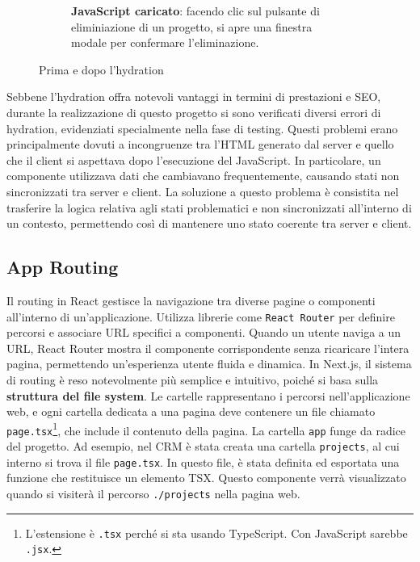 \documentclass[target=bach,aauheader=,style=]{thud}
\begin{document}
\begin{figure}[H]
\begin{subfigure}[b]{0.46\textwidth}
        \caption{\textbf{JavaScript caricato}: facendo clic sul pulsante di eliminiazione di un progetto, si apre una finestra modale per confermare l'eliminazione.}
        \label{fig:img2}
    \end{subfigure}
    \caption{Prima e dopo l'hydration}
    \label{fig:two_images}
\end{figure}

\label{sec:hydration_error}
\noindent Sebbene l'hydration offra notevoli vantaggi in termini di prestazioni e SEO, durante la realizzazione di questo progetto si sono verificati diversi errori di hydration, evidenziati specialmente nella fase di testing. Questi problemi erano principalmente dovuti a incongruenze tra l'HTML generato dal server e quello che il client si aspettava dopo l'esecuzione del JavaScript. In particolare, un componente utilizzava dati che cambiavano frequentemente, causando stati non sincronizzati tra server e client. La soluzione a questo problema è consistita nel trasferire la logica relativa agli stati problematici e non sincronizzati all'interno di un contesto, permettendo così di mantenere uno stato coerente tra server e client.

\subsection{App Routing}
Il routing in React gestisce la navigazione tra diverse pagine o componenti all'interno di un'applicazione. Utilizza librerie come \texttt{React Router} per definire percorsi e associare URL specifici a componenti. Quando un utente naviga a un URL, React Router mostra il componente corrispondente senza ricaricare l'intera pagina, permettendo un'esperienza utente fluida e dinamica. In Next.js, il sistema di routing è reso notevolmente più semplice e intuitivo, poiché si basa sulla \textbf{struttura del file system}. Le cartelle rappresentano i percorsi nell'applicazione web, e ogni cartella dedicata a una pagina deve contenere un file chiamato \texttt{page.tsx}\footnote{L'estensione è \texttt{.tsx} perché si sta usando TypeScript. Con JavaScript sarebbe \texttt{.jsx}.}, che include il contenuto della pagina. La cartella \texttt{app} funge da radice del progetto. Ad esempio, nel CRM è stata creata una cartella \texttt{projects}, al cui interno si trova il file \texttt{page.tsx}. In questo file, è stata definita ed esportata una funzione che restituisce un elemento TSX. Questo componente verrà visualizzato quando si visiterà il percorso \texttt{./projects} nella pagina web.
\end{document}
